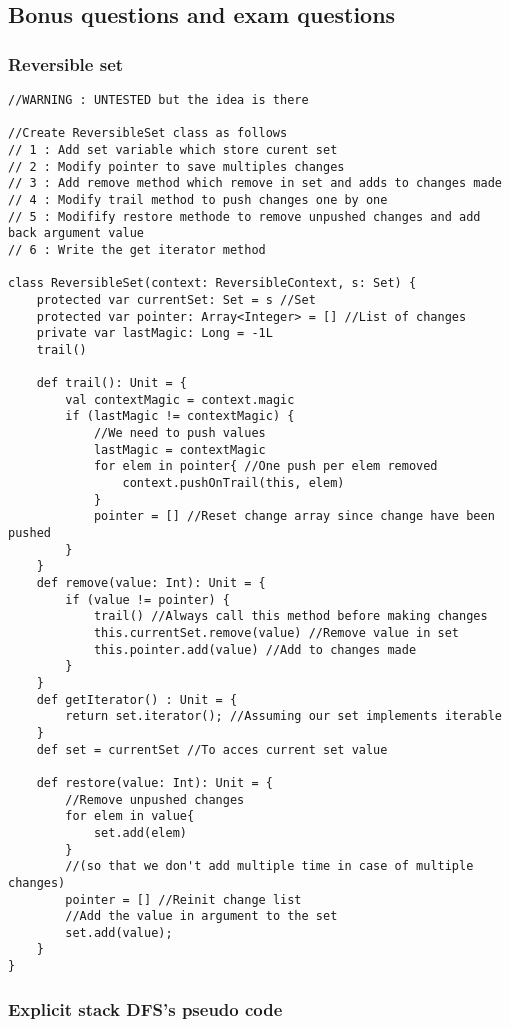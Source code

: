 \subsection{Bonus questions and exam questions}

\subsubsection{Reversible set}

\begin{lstlisting}
//WARNING : UNTESTED but the idea is there

//Create ReversibleSet class as follows
// 1 : Add set variable which store curent set
// 2 : Modify pointer to save multiples changes
// 3 : Add remove method which remove in set and adds to changes made
// 4 : Modify trail method to push changes one by one
// 5 : Modifify restore methode to remove unpushed changes and add back argument value
// 6 : Write the get iterator method

class ReversibleSet(context: ReversibleContext, s: Set) {
	protected var currentSet: Set = s //Set
	protected var pointer: Array<Integer> = [] //List of changes
	private var lastMagic: Long = -1L
	trail()
	
	def trail(): Unit = {
		val contextMagic = context.magic
		if (lastMagic != contextMagic) {
			//We need to push values
			lastMagic = contextMagic
			for elem in pointer{ //One push per elem removed
				context.pushOnTrail(this, elem)
			}
			pointer = [] //Reset change array since change have been pushed
		}
	}
	def remove(value: Int): Unit = {
		if (value != pointer) {
			trail() //Always call this method before making changes
			this.currentSet.remove(value) //Remove value in set
			this.pointer.add(value) //Add to changes made
		}
	}
	def getIterator() : Unit = {
		return set.iterator(); //Assuming our set implements iterable
	}
	def set = currentSet //To acces current set value
	
	def restore(value: Int): Unit = {
		//Remove unpushed changes
		for elem in value{
			set.add(elem)
		}
		//(so that we don't add multiple time in case of multiple changes)
		pointer = [] //Reinit change list 
		//Add the value in argument to the set
		set.add(value);
	}
}
\end{lstlisting}

\subsubsection{Explicit stack DFS's pseudo code}

